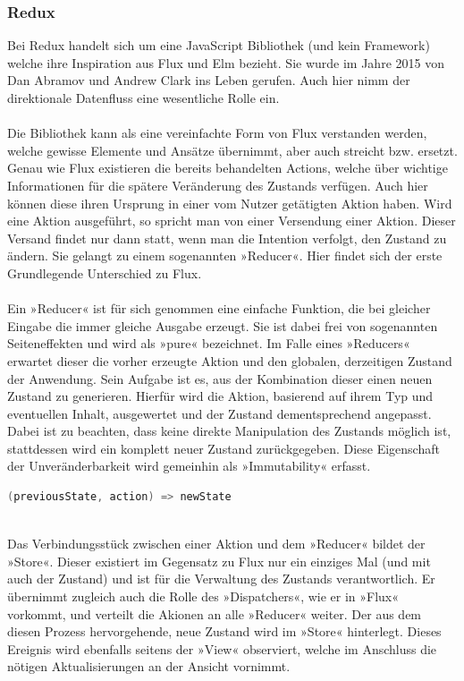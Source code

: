 \subsubsection{Redux}
\label{subsec:redux}
Bei Redux handelt sich um eine JavaScript Bibliothek (und kein Framework) welche ihre Inspiration aus Flux und Elm bezieht. Sie wurde im Jahre 2015 von Dan Abramov und Andrew Clark ins Leben gerufen.
\cite{reduxIntroduction}
Auch hier nimm der direktionale Datenfluss eine wesentliche Rolle ein.
\\
\\
Die Bibliothek kann als eine vereinfachte Form von Flux verstanden werden, welche gewisse Elemente und Ansätze übernimmt, aber auch streicht bzw. ersetzt. Genau wie Flux existieren die bereits behandelten Actions, welche über wichtige Informationen für die spätere Veränderung des Zustands verfügen. Auch hier können diese ihren Ursprung in einer vom Nutzer getätigten Aktion haben. Wird eine Aktion ausgeführt, so spricht man von einer Versendung einer Aktion. Dieser Versand findet nur dann statt, wenn man die Intention verfolgt, den Zustand zu ändern. Sie gelangt zu einem sogenannten »Reducer«. Hier findet sich der erste Grundlegende Unterschied zu Flux.
\\
\\
Ein »Reducer« ist für sich genommen eine einfache Funktion, die bei gleicher Eingabe die immer gleiche Ausgabe erzeugt. Sie ist dabei frei von sogenannten Seiteneffekten und wird als »pure« bezeichnet. Im Falle eines »Reducers« erwartet dieser die vorher erzeugte Aktion und den globalen, derzeitigen Zustand der Anwendung. Sein Aufgabe ist es, aus der Kombination dieser einen neuen Zustand zu generieren. Hierfür wird die Aktion, basierend auf ihrem Typ und eventuellen Inhalt, ausgewertet und der Zustand dementsprechend angepasst. Dabei ist zu beachten, dass keine direkte Manipulation des Zustands möglich ist, stattdessen wird ein komplett neuer Zustand zurückgegeben. Diese Eigenschaft der Unveränderbarkeit wird gemeinhin als »Immutability« erfasst.
\\
\begin{lstlisting}[frame=single, language=Java]
(previousState, action) => newState
\end{lstlisting}
\ \\
Das Verbindungsstück zwischen einer Aktion und dem »Reducer« bildet der »Store«. Dieser existiert im Gegensatz zu Flux nur ein einziges Mal (und mit auch der Zustand) und ist für die Verwaltung des Zustands verantwortlich. Er übernimmt zugleich auch die Rolle des »Dispatchers«, wie er in »Flux« vorkommt, und verteilt die Akionen an alle »Reducer« weiter. Der aus dem diesen Prozess hervorgehende, neue Zustand wird im »Store« hinterlegt. Dieses Ereignis wird ebenfalls seitens der »View« observiert, welche im Anschluss die nötigen Aktualisierungen an der Ansicht vornimmt.
